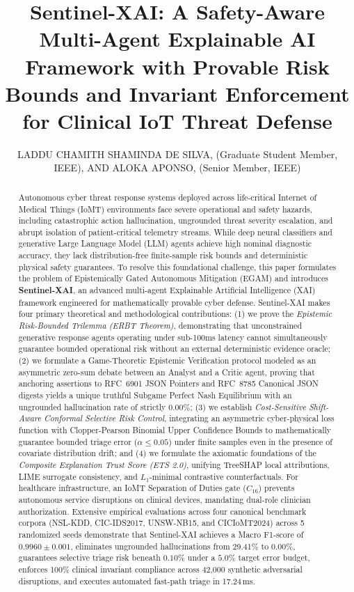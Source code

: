 \documentclass{ieeeaccess}
\title{Sentinel-XAI: A Safety-Aware Multi-Agent Explainable AI Framework with Provable Risk Bounds and Invariant Enforcement for Clinical IoT Threat Defense}
\author{\uppercase{Laddu Chamith Shaminda De Silva}\authorrefmark{1,2}, (Graduate Student Member, IEEE), AND \uppercase{Aloka Aponso}\authorrefmark{1}, (Senior Member, IEEE)}
\begin{document}
\begin{abstract}
Autonomous cyber threat response systems deployed across life-critical Internet of Medical Things (IoMT) environments face severe operational and safety hazards, including catastrophic action hallucination, ungrounded threat severity escalation, and abrupt isolation of patient-critical telemetry streams. While deep neural classifiers and generative Large Language Model (LLM) agents achieve high nominal diagnostic accuracy, they lack distribution-free finite-sample risk bounds and deterministic physical safety guarantees. To resolve this foundational challenge, this paper formulates the problem of Epistemically Gated Autonomous Mitigation (EGAM) and introduces \textbf{Sentinel-XAI}, an advanced multi-agent Explainable Artificial Intelligence (XAI) framework engineered for mathematically provable cyber defense. Sentinel-XAI makes four primary theoretical and methodological contributions: (1) we prove the \textit{Epistemic Risk-Bounded Trilemma (ERBT Theorem)}, demonstrating that unconstrained generative response agents operating under sub-100ms latency cannot simultaneously guarantee bounded operational risk without an external deterministic evidence oracle; (2) we formulate a Game-Theoretic Epistemic Verification protocol modeled as an asymmetric zero-sum debate between an Analyst and a Critic agent, proving that anchoring assertions to RFC~6901 JSON Pointers and RFC~8785 Canonical JSON digests yields a unique truthful Subgame Perfect Nash Equilibrium with an ungrounded hallucination rate of strictly 0.00\%; (3) we establish \textit{Cost-Sensitive Shift-Aware Conformal Selective Risk Control}, integrating an asymmetric cyber-physical loss function with Clopper-Pearson Binomial Upper Confidence Bounds to mathematically guarantee bounded triage error ($\alpha \le 0.05$) under finite samples even in the presence of covariate distribution drift; and (4) we formulate the axiomatic foundations of the \textit{Composite Explanation Trust Score (ETS 2.0)}, unifying TreeSHAP local attributions, LIME surrogate consistency, and $L_1$-minimal contrastive counterfactuals. For healthcare infrastructure, an IoMT Separation of Duties gate ($C_{16}$) prevents autonomous service disruptions on clinical devices, mandating dual-role clinician authorization. Extensive empirical evaluations across four canonical benchmark corpora (NSL-KDD, CIC-IDS2017, UNSW-NB15, and CICIoMT2024) across 5 randomized seeds demonstrate that Sentinel-XAI achieves a Macro F1-score of $0.9960 \pm 0.001$, eliminates ungrounded hallucinations from 29.41\% to 0.00\%, guarantees selective triage risk beneath $0.10\%$ under a $5.0\%$ target error budget, enforces 100\% clinical invariant compliance across 42,000 synthetic adversarial disruptions, and executes automated fast-path triage in 17.24\,ms.
\end{abstract}
\end{document}
